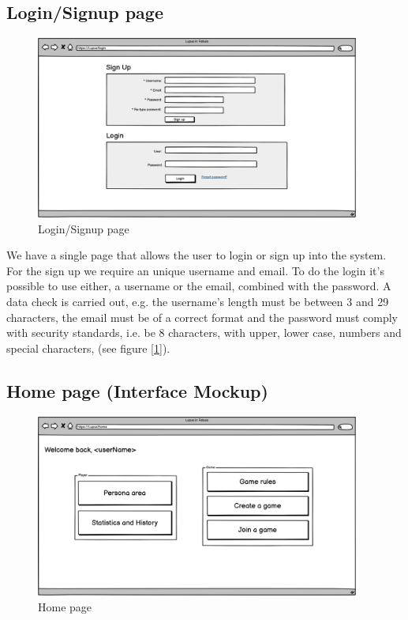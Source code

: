 \subsection{Login/Signup page}
\begin{figure}[h!] 
    \centering
    \includegraphics[height=6cm]{images/Page/Login_singup.png}
    \caption{Login/Signup page}
    \label{fig:Login_singup_page}
\end{figure}

We have a single page that allows the user to login or sign up into the system.
For the sign up we require an unique username and email. To do the login it's possible to use either, a username or the email, combined with the password.
A data check is carried out, e.g. the username's length must be between 3 and 29 characters, the email must be of a correct format and the password must comply with security standards, i.e. be 8 characters, with upper, lower case, numbers and special characters, (see figure [\ref{fig:Login_singup_page}]).

\subsection{Home page (Interface Mockup)}
\begin{figure}[h!] 
    \centering
    \includegraphics[height=6cm]{images/Page/Home.png}
    \caption{Home page}
    \label{fig:home_page}

\end{figure}


